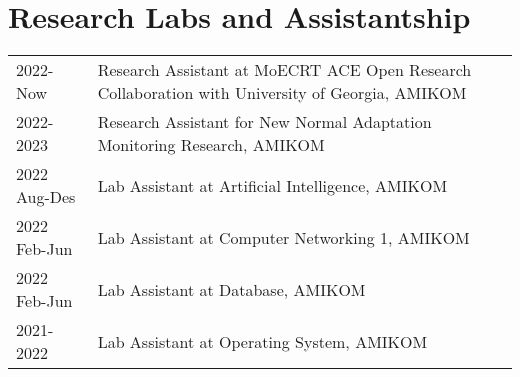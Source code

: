 \documentclass[12pt,letterpaper]{report}
\newcommand{\listitemspace}{0.25em}
\renewenvironment{itemize}
{\begin{list}{}{\setlength{\leftmargin}{0em}
                \setlength{\parskip}{0em}
                \setlength{\itemsep}{\listitemspace}
                \setlength{\parsep}{\listitemspace}}}
{\end{list}}
\begin{document}


    \section*{Research Labs and Assistantship}
    \begin{tabular}{@{}p{}p{}}
        2022-Now & Research Assistant at MoECRT ACE Open Research Collaboration with University of Georgia, AMIKOM \\
        2022-2023 & Research Assistant for New Normal Adaptation Monitoring Research, AMIKOM \\
        2022 Aug-Des & Lab Assistant at Artificial Intelligence, AMIKOM \\
        2022 Feb-Jun & Lab Assistant at Computer Networking 1, AMIKOM \\
        2022 Feb-Jun & Lab Assistant at Database, AMIKOM \\
        2021-2022 & Lab Assistant at Operating System, AMIKOM \\
    \end{tabular}

\end{document}
